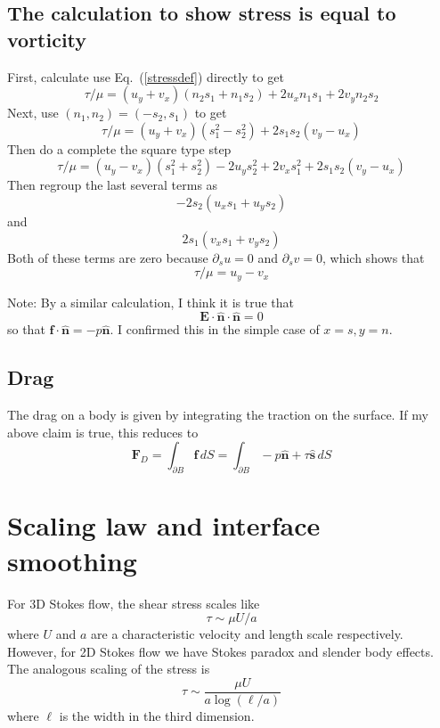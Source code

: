 \documentclass[11pt]{article}
\newcommand{\vsp}[1]{\vspace{#1 pc} \noindent}
\newcommand{\pdi}[2] { {\partial_#2} #1 }
\newcommand{\bvec}[1]{\ensuremath{\boldsymbol{#1}}}
\newcommand{\nhat}{\hat{\bvec{n}}}
\newcommand{\shat}{\hat{\bvec{s}}}
\newcommand {\bdry} {\partial B}
\begin{document}
\subsection{The calculation to show stress is equal to vorticity}
First, calculate use Eq.~(\ref{stressdef}) directly to get
\begin{equation}
\tau/\mu = (u_y+v_x) (n_2 s_1 + n_1 s_2 ) + 2 u_x n_1 s_1 + 2 v_y n_2 s_2
\end{equation}
Next, use $(n_1,n_2) = (-s_2,s_1)$ to get
\begin{equation}
\tau/\mu = (u_y+v_x) (s_1^2 - s_2^2) + 2s_1 s_2 (v_y - u_x)
\end{equation}
Then do a complete the square type step
\begin{equation}
\tau/\mu = (u_y - v_x) (s_1^2 + s_2^2) - 2 u_y s_2^2 + 2v_x s_1^2 + 2s_1 s_2 (v_y - u_x)
\end{equation}
Then regroup the last several terms as
\begin{equation}
-2 s_2 ( u_x s_1 + u_y s_2 )
\end{equation}
and
\begin{equation}
2 s_1 ( v_x s_1 + v_y s_2)
\end{equation}
Both of these terms are zero because $\pdi{u}{s} = 0$ and $\pdi{v}{s} = 0$, which shows that
\begin{equation}
\tau/\mu = u_y - v_x
\end{equation}

\vsp{1}
Note: By a similar calculation, I think it is true that
\begin{equation}
\bvec{E} \cdot \nhat \cdot \nhat = 0
\end{equation}
so that $\bvec{f} \cdot \nhat = -p \nhat$. I confirmed this in the simple case of $x=s, y=n$.

\subsection{Drag}
The drag on a body is given by integrating the traction on the surface. If my above claim is true, this reduces to
\begin{equation}
\bvec{F}_D = \int_{\bdry} \bvec{f} \, dS = \int_{\bdry} -p \nhat + \tau \shat \, dS
\end{equation}


\section{Scaling law and interface smoothing}
For 3D Stokes flow, the shear stress scales like
\begin{equation}
\tau \sim \mu U/a
\end{equation}
where $U$ and $a$ are a characteristic velocity and length scale respectively.  However, for 2D Stokes flow we have Stokes paradox and slender body effects. The analogous scaling of the stress is
\begin{equation}
\tau \sim \frac{\mu U}{a \log(\ell/a)}
\end{equation}
where $\ell$ is the width in the third dimension. 
\end{document}
